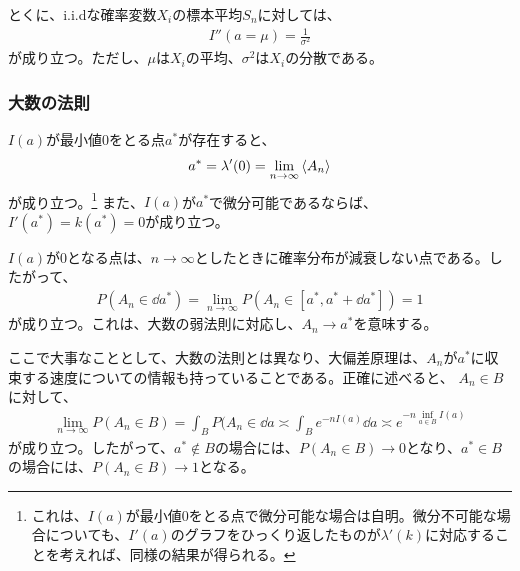 \documentclass[a4paper,11pt]{jsarticle}
\numberwithin{equation}{section}
\begin{document}
とくに、i.i.dな確率変数$X_i$の標本平均$S_n$に対しては、
\begin{align}
    I''(a = \mu) = \frac{1}{\sigma^2}
\end{align}
が成り立つ。ただし、$\mu$は$X_i$の平均、$\sigma^2$は$X_i$の分散である。

\subsubsection{大数の法則}
$I(a)$が最小値0をとる点$a^*$が存在すると、
\begin{align}
    a^* = \lambda'(0) = \lim_{n \to \infty} \ev{A_n}
\end{align}
が成り立つ。\footnote{これは、$I(a)$が最小値0をとる点で微分可能な場合は自明。微分不可能な場合についても、$I'(a)$のグラフをひっくり返したものが$\lambda'(k)$に対応することを考えれば、同様の結果が得られる。}
また、$I(a)$が$a^*$で微分可能であるならば、
$I'(a^*) = k(a^*) = 0$が成り立つ。

$I(a)$が0となる点は、$n\to \infty$としたときに確率分布が減衰しない点である。したがって、
\begin{align}
    P(A_n \in \dd a^*) = \lim_{n \to \infty} P(A_n \in [a^*, a^* + \dd a^*]) = 1
\end{align}
が成り立つ。これは、大数の弱法則に対応し、$ A_n \to a^*$を意味する。

ここで大事なこととして、大数の法則とは異なり、大偏差原理は、$A_n$が$a^*$に収束する速度についての情報も持っていることである。正確に述べると、
$A_n \in B$に対して、
\begin{align}
    \lim_{n \to \infty} P(A_n \in B) = \int_B P(A_n \in \dd a \asymp \int_{B} e^{-nI(a)} \dd a \asymp e^{-n\inf_{a \in B} I(a)}
\end{align}
が成り立つ。したがって、$a^* \notin B$の場合には、$P(A_n \in B) \to 0$となり、$a^* \in B$の場合には、$P(A_n \in B) \to 1$となる。
\end{document}
